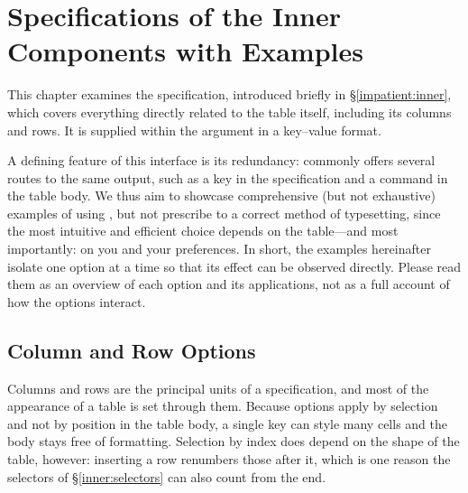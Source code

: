 \chapter{Specifications of the Inner Components with Examples}
This chapter examines the  specification, introduced briefly in \S\ref{impatient:inner}, which covers everything directly related to the table itself, including its columns and rows. It is supplied within the  argument in a key--value format.

A defining feature of this interface is its redundancy:  commonly offers several routes to the same output, such as a key in the specification and a command in the table body.
We thus aim to showcase comprehensive (but not exhaustive) examples of using , but not prescribe to a correct method of typesetting, since the most intuitive and efficient choice depends on the table---and most importantly: on you and your preferences.
In short, the examples hereinafter isolate one option at a time so that its effect can be observed directly.
Please read them as an overview of each option and its applications, not as a full account of how the options interact.

\section{Column and Row Options}\label{inner:colrow}
Columns and rows are the principal units of a specification, and most of the appearance of a table is set through them. Because options apply by selection and not by position in the table body, a single key can style many cells and the body stays free of formatting. Selection by index does depend on the shape of the table, however: inserting a row renumbers those after it, which is one reason the selectors of \S\ref{inner:selectors} can also count from the end.

